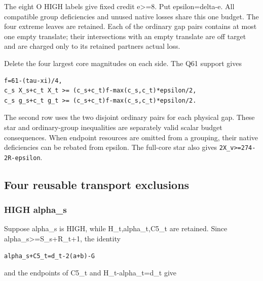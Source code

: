 \documentclass[10pt,a4paper]{article}
\theoremstyle{definition}
\begin{document}
The eight O HIGH labels give fixed credit e\textgreater=\allowbreak{}8. Put
epsilon=\allowbreak{}delta-e. All compatible group deficiencies and unused native
losses share this one budget. The four extreme leaves are retained. Each
of the ordinary gap pairs contains at most one empty translate; their
intersections with an empty translate are off target and are charged
only to its retained partner\textquotesingle s actual loss.

Delete the four largest core magnitudes on each side. The Q61 support
gives

\begin{lstlisting}
f=61-(tau-xi)/4,
c_s X_s+c_t X_t >= (c_s+c_t)f-max(c_s,c_t)*epsilon/2,
c_s g_s+c_t g_t >= (c_s+c_t)f-max(c_s,c_t)*epsilon/2.
\end{lstlisting}

The second row uses the two disjoint ordinary pairs for each physical
gap. These star and ordinary-group inequalities are separately valid
scalar budget consequences. When endpoint resources are omitted from a
grouping,\allowbreak{} their native deficiencies can be rebated from epsilon. The
full-core star also gives
\texttt{2X\_\allowbreak{}\allowbreak{}v>=\allowbreak{}274-2R-epsilon}.

\hypertarget{four-reusable-transport-exclusions}{%
\subsection{Four reusable transport
exclusions}\label{four-reusable-transport-exclusions}}

\hypertarget{high-alpha_s}{%
\subsubsection{HIGH alpha\_\allowbreak{}s}\label{high-alpha_s}}

Suppose alpha\_\allowbreak{}s is HIGH,\allowbreak{} while H\_\allowbreak{}t,\allowbreak{}alpha\_\allowbreak{}t,\allowbreak{}C5\_\allowbreak{}t are retained. Since
alpha\_\allowbreak{}s\textgreater=\allowbreak{}S\_\allowbreak{}s+\allowbreak{}R\_\allowbreak{}t+\allowbreak{}1,\allowbreak{} the identity

\begin{lstlisting}
alpha_s+C5_t=d_t-2(a+b)-G
\end{lstlisting}

and the endpoints of C5\_\allowbreak{}t and H\_\allowbreak{}t-alpha\_\allowbreak{}t=\allowbreak{}d\_\allowbreak{}t give
\end{document}
